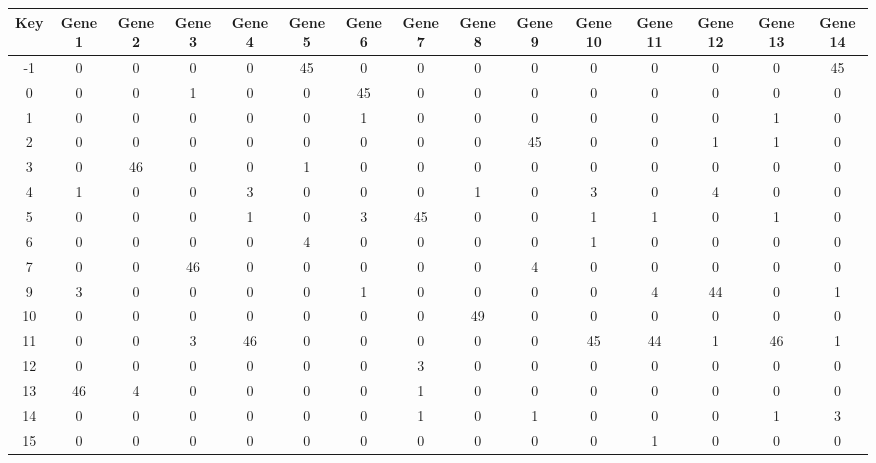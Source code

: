 \begin{tabular}{|c|c|c|c|c|c|c|c|c|c|c|c|c|c|c|}
\hline
Key & Gene 1 & Gene 2 & Gene 3 & Gene 4 & Gene 5 & Gene 6 & Gene 7 & Gene 8 & Gene 9 & Gene 10 & Gene 11 & Gene 12 & Gene 13 & Gene 14 \\
\hline
-1 & 0 & 0 & 0 & 0 & 45 & 0 & 0 & 0 & 0 & 0 & 0 & 0 & 0 & 45 \\
0 & 0 & 0 & 1 & 0 & 0 & 45 & 0 & 0 & 0 & 0 & 0 & 0 & 0 & 0 \\
1 & 0 & 0 & 0 & 0 & 0 & 1 & 0 & 0 & 0 & 0 & 0 & 0 & 1 & 0 \\
2 & 0 & 0 & 0 & 0 & 0 & 0 & 0 & 0 & 45 & 0 & 0 & 1 & 1 & 0 \\
3 & 0 & 46 & 0 & 0 & 1 & 0 & 0 & 0 & 0 & 0 & 0 & 0 & 0 & 0 \\
4 & 1 & 0 & 0 & 3 & 0 & 0 & 0 & 1 & 0 & 3 & 0 & 4 & 0 & 0 \\
5 & 0 & 0 & 0 & 1 & 0 & 3 & 45 & 0 & 0 & 1 & 1 & 0 & 1 & 0 \\
6 & 0 & 0 & 0 & 0 & 4 & 0 & 0 & 0 & 0 & 1 & 0 & 0 & 0 & 0 \\
7 & 0 & 0 & 46 & 0 & 0 & 0 & 0 & 0 & 4 & 0 & 0 & 0 & 0 & 0 \\
9 & 3 & 0 & 0 & 0 & 0 & 1 & 0 & 0 & 0 & 0 & 4 & 44 & 0 & 1 \\
10 & 0 & 0 & 0 & 0 & 0 & 0 & 0 & 49 & 0 & 0 & 0 & 0 & 0 & 0 \\
11 & 0 & 0 & 3 & 46 & 0 & 0 & 0 & 0 & 0 & 45 & 44 & 1 & 46 & 1 \\
12 & 0 & 0 & 0 & 0 & 0 & 0 & 3 & 0 & 0 & 0 & 0 & 0 & 0 & 0 \\
13 & 46 & 4 & 0 & 0 & 0 & 0 & 1 & 0 & 0 & 0 & 0 & 0 & 0 & 0 \\
14 & 0 & 0 & 0 & 0 & 0 & 0 & 1 & 0 & 1 & 0 & 0 & 0 & 1 & 3 \\
15 & 0 & 0 & 0 & 0 & 0 & 0 & 0 & 0 & 0 & 0 & 1 & 0 & 0 & 0 \\
\hline
\end{tabular}